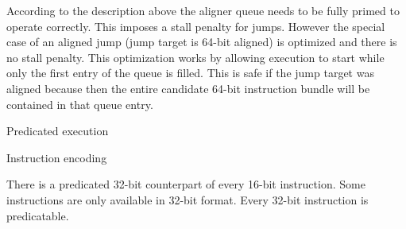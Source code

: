 \documentclass[11pt]{book}
\begin{document}
According to the description above the aligner queue needs to be fully
primed to operate correctly. This imposes a stall penalty for
jumps. However the special case of an aligned jump (jump target is
64-bit aligned) is optimized and there is no stall penalty. This
optimization works by allowing execution to start while only the first
entry of the queue is filled. This is safe if the jump target was
aligned because then the entire candidate 64-bit instruction bundle
will be contained in that queue entry.

Predicated execution

Instruction encoding

There is a predicated 32-bit counterpart of every 16-bit instruction.
Some instructions are only available in 32-bit format.  Every 32-bit
instruction is predicatable.
\end{document}
